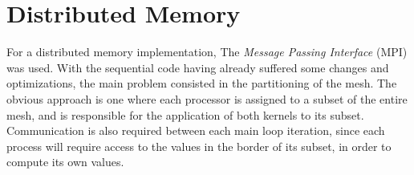\section{Distributed Memory}
\label{sec:mpi}

For a distributed memory implementation, The \textit{Message Passing Interface} (MPI) was used. With the sequential code having already suffered some changes and optimizations, the main problem consisted in the partitioning of the mesh. The obvious approach is one where each processor is assigned to a subset of the entire mesh, and is responsible for the application of both kernels to its subset. Communication is also required between each main loop iteration, since each process will require access to the values in the border of its subset, in order to compute its own values.





